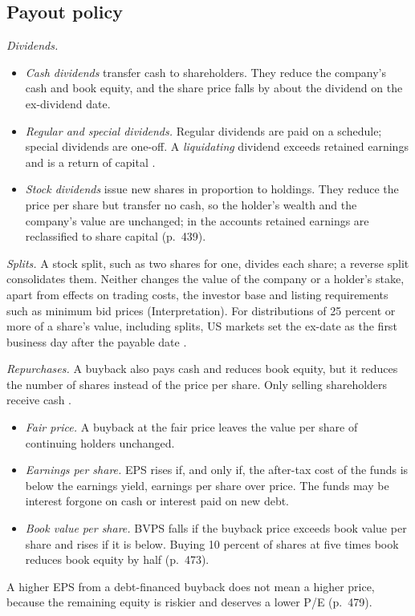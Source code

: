 \subsection{Payout policy}

\begin{qfmethod}\label{meth:distribution-effects}
 \emph{Dividends.}
\begin{itemize}
\item \emph{Cash dividends} transfer cash to shareholders. They reduce the company's cash and book equity, and the share price falls by about the dividend on the ex-dividend date.
\item \emph{Regular and special dividends.} Regular dividends are paid on a schedule; special dividends are one-off. A \emph{liquidating} dividend exceeds retained earnings and is a return of capital \citep[p.~439]{applied-corporate-finance-2014}.
\item \emph{Stock dividends} issue new shares in proportion to holdings. They reduce the price per share but transfer no cash, so the holder's wealth and the company's value are unchanged; in the accounts retained earnings are reclassified to share capital (p.~439).
\end{itemize}

\emph{Splits.} A stock split, such as two shares for one, divides each share; a reverse split consolidates them. Neither changes the value of the company or a holder's stake, apart from effects on trading costs, the investor base and listing requirements such as minimum bid prices (Interpretation). For distributions of 25 percent or more of a share's value, including splits, US markets set the ex-date as the first business day after the payable date \citep[para.~(b)(2)]{finra-rule-11140}.

\emph{Repurchases.} A buyback also pays cash and reduces book equity, but it reduces the number of shares instead of the price per share. Only selling shareholders receive cash \citep[p.~473]{applied-corporate-finance-2014}.
\begin{itemize}
\item \emph{Fair price.} A buyback at the fair price leaves the value per share of continuing holders unchanged.
\item \emph{Earnings per share.} EPS rises if, and only if, the after-tax cost of the funds is below the earnings yield, earnings per share over price. The funds may be interest forgone on cash or interest paid on new debt.
\item \emph{Book value per share.} BVPS falls if the buyback price exceeds book value per share and rises if it is below. Buying 10 percent of shares at five times book reduces book equity by half (p.~473).
\end{itemize}
A higher EPS from a debt-financed buyback does not mean a higher price, because the remaining equity is riskier and deserves a lower P/E (p.~479).


\end{qfmethod}
